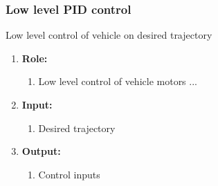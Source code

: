\subsubsection{Low level PID control}
	Low level control of vehicle on desired trajectory
	\begin{enumerate}[]
	\item \textbf{Role:}
		\begin{enumerate}[]
		\item Low level control of vehicle motors ...
		\end{enumerate}
	\item \textbf{Input:}
		\begin{enumerate}[1.]
		\item Desired trajectory
		\end{enumerate}
	\item \textbf{Output:}
		\begin{enumerate}[2.]
		\item Control inputs 
		\end{enumerate}
	\end{enumerate}


